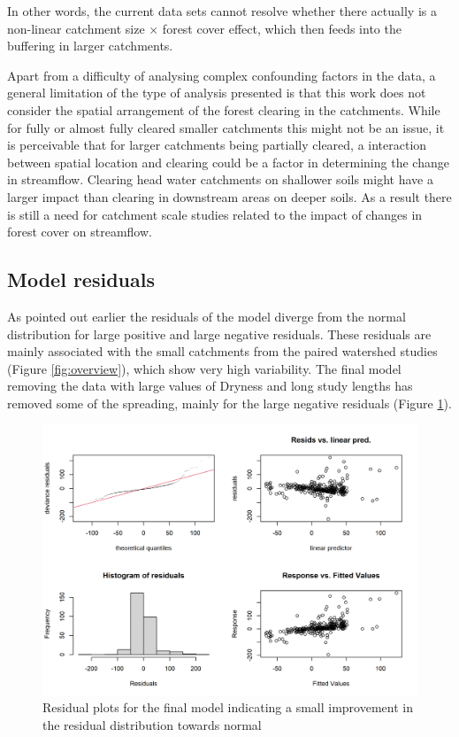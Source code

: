 \documentclass[]{elsarticle} %
\begin{document}
In other words, the current data sets cannot resolve whether there actually is a non-linear catchment size × forest cover effect, which then feeds into the buffering in larger catchments.

Apart from a difficulty of analysing complex confounding factors in the data, a general limitation of the type of analysis presented is that this work does not consider the spatial arrangement of the forest clearing in the catchments. While for fully or almost fully cleared smaller catchments this might not be an issue, it is perceivable that for larger catchments being partially cleared, a interaction between spatial location and clearing could be a factor in determining the change in streamflow. Clearing head water catchments on shallower soils might have a larger impact than clearing in downstream areas on deeper soils. As a result there is still a need for catchment scale studies related to the impact of changes in forest cover on streamflow.

\hypertarget{model-residuals}{%
\subsection{Model residuals}\label{model-residuals}}

As pointed out earlier the residuals of the model diverge from the normal distribution for large positive and large negative residuals. These residuals are mainly associated with the small catchments from the paired watershed studies (Figure \ref{fig:overview}), which show very high variability. The final model removing the data with large values of Dryness and long study lengths has removed some of the spreading, mainly for the large negative residuals (Figure \ref{fig:gamcheckredLength}).

\begin{figure}
\includegraphics[width=0.9\linewidth]{residual_plot_model7} \caption{Residual plots for the final model indicating a small improvement in the residual distribution towards normal}\label{fig:gamcheckredLength}
\end{figure}
\end{document}
